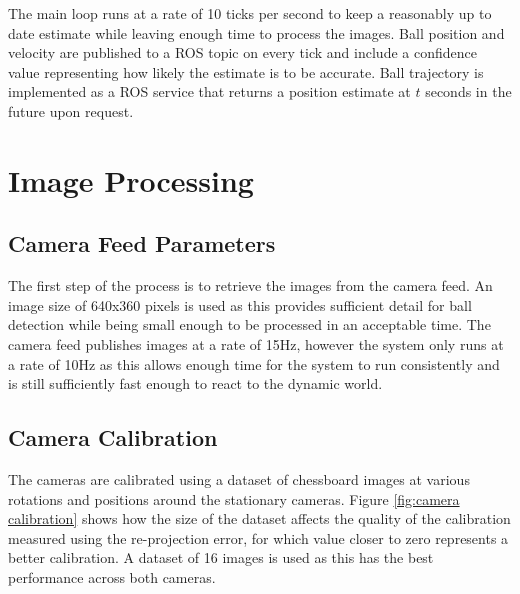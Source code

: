 The main loop runs at a rate of 10 ticks per second to keep a reasonably up to date estimate while leaving enough time to process the images. Ball position and velocity are published to a ROS topic on every tick and include a confidence value representing how likely the estimate is to be accurate. Ball trajectory is implemented as a ROS service that returns a position estimate at $t$ seconds in the future upon request.

\section{Image Processing}

\subsection{Camera Feed Parameters}

The first step of the process is to retrieve the images from the camera feed. An image size of 640x360 pixels is used as this provides sufficient detail for ball detection while being small enough to be processed in an acceptable time. The camera feed publishes images at a rate of 15Hz, however the system only runs at a rate of 10Hz as this allows enough time for the system to run consistently and is still sufficiently fast enough to react to the dynamic world. 

\subsection{Camera Calibration}

The cameras are calibrated using a dataset of chessboard images at various rotations and positions around the stationary cameras. Figure \ref{fig:camera calibration} shows how the size of the dataset affects the quality of the calibration measured using the re-projection error, for which value closer to zero represents a better calibration. A dataset of 16 images is used as this has the best performance across both cameras. 

